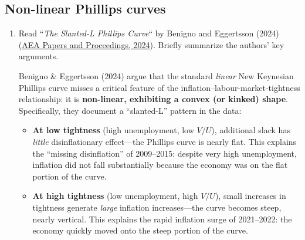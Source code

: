 \documentclass[dvipsnames,11pt]{article}
\begin{document}
    \subsection{Non-linear Phillips curves}

        \begin{enumerate}[resume]
            \item Read ``\textit{The Slanted-L Phillips Curve}`` by Benigno and Eggertsson (2024) (\href{https://doi.org/10.1257/pandp.20241051}{AEA Papers and Proceedings, 2024}). Briefly summarize the authors’ key arguments.

                \begin{solution}

                    Benigno \& Eggertsson (2024) argue that the standard \emph{linear} New Keynesian Phillips curve misses a critical feature of the inflation--labour-market-tightness relationship: it is \textbf{non-linear, exhibiting a convex (or kinked) shape}. Specifically, they document a ``slanted-L'' pattern in the data:

                    \begin{itemize}
                        \item \textbf{At low tightness} (high unemployment, low $V/U$), additional slack has \emph{little} disinflationary effect---the Phillips curve is nearly flat. This explains the ``missing disinflation'' of 2009--2015: despite very high unemployment, inflation did not fall substantially because the economy was on the flat portion of the curve.
                            
                        \item \textbf{At high tightness} (low unemployment, high $V/U$), small increases in tightness generate \emph{large} inflation increases---the curve becomes steep, nearly vertical. This explains the rapid inflation surge of 2021--2022: the economy quickly moved onto the steep portion of the curve.
                    \end{itemize}
                    

\end{solution}
\end{enumerate}
\end{document}
